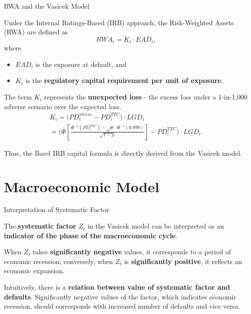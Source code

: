 \documentclass{beamer}
\begin{document}
\begin{frame}{RWA and the Vasicek Model}
\justifying
\small

Under the Internal Ratings-Based (IRB) approach, the Risk-Weighted Assets (RWA) are defined as
\begin{equation*}
\textit{RWA}_i = K_i \cdot EAD_i,
\end{equation*}
where
\begin{itemize}
\item $EAD_i$ is the exposure at default, and
\item $K_i$ is the \textbf{regulatory capital requirement per unit of exposure}.
\end{itemize}

\medskip

The term $K_i$ represents the \textbf{unexpected loss} - the excess loss under a 1-in-1,000 adverse scenario over the expected loss.
{\tiny
\begin{multline*}
K_i
= \big(PD_i^{stress} - PD_i^{TTC}\big) \cdot LGD_i \\
= \Bigg(\Phi \left[\frac{\Phi^{-1}(PD_i^{TTC}) - \sqrt{\rho} \cdot \Phi^{-1}(0.999)}{\sqrt{1 - \rho}}\right] - PD_i^{TTC}\Bigg) \cdot LGD_i.
\end{multline*}
}

\medskip

Thus, the Basel IRB capital formula is directly derived from the Vasicek model.
\end{frame}

\section{Macroeconomic Model}

\begin{frame}{Interpretation of Systematic Factor}
\justifying
\small

The \textbf{systematic factor} $Z_t$ in the Vasicek model can be interpreted as an \textbf{indicator of the phase of the macroeconomic cycle}.

\medskip

When $Z_t$ takes \textbf{significantly negative} values, it corresponds to a period of economic recession; conversely, when $Z_t$ is \textbf{significantly positive}, it reflects an economic expansion.

\medskip

Intuitively, there is a \textbf{relation between value of systematic factor and defaults}. Significantly negative values of the factor, which indicates economic recession, should corresponds with increased number of defaults and vice versa.

\end{frame}
\end{document}
